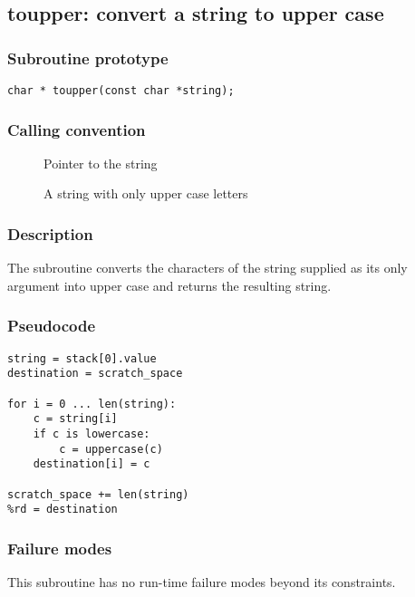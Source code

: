 \clearpage
{}
{}
\label{subr:toupper}
\subsection*{toupper: convert a string to upper case}

\subsubsection*{Subroutine prototype}

\begin{verbatim}
char * toupper(const char *string);
\end{verbatim}

\subsubsection*{Calling convention}

\begin{description}
\item[] Pointer to the string
\item[] A string with only upper case letters
\end{description}

\subsubsection*{Description}

The  subroutine converts the characters of the
string supplied as its only argument into upper case and returns the
resulting string.

\subsubsection*{Pseudocode}

\begin{verbatim}
string = stack[0].value
destination = scratch_space

for i = 0 ... len(string):
    c = string[i]
    if c is lowercase:
        c = uppercase(c)
    destination[i] = c

scratch_space += len(string)
%rd = destination
\end{verbatim}

\subsubsection*{Failure modes}

This subroutine has no run-time failure modes beyond its constraints.

